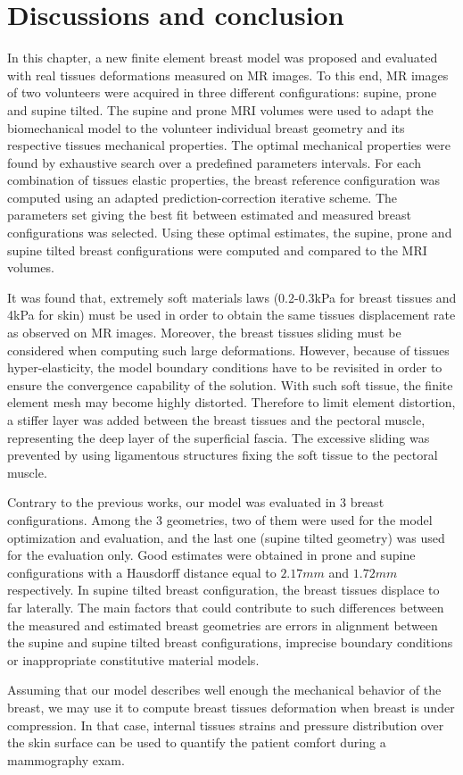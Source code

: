 \section{Discussions and conclusion} \label{section:validation:discutionconclusion}

In this chapter, a new finite element breast model was proposed and  evaluated with real tissues deformations measured on MR images. To this end, MR images of two volunteers were acquired in three different configurations: supine, prone and supine tilted. The supine and prone MRI volumes were used to adapt the biomechanical model to the volunteer individual breast geometry and its respective tissues mechanical properties.  The optimal mechanical properties were found by exhaustive search over a predefined parameters intervals. For each combination of tissues elastic properties,  the breast reference configuration was computed using an adapted prediction-correction iterative scheme. The parameters set giving the best fit between estimated and measured breast configurations was selected.  Using these optimal estimates, the supine, prone and supine tilted breast configurations were computed and compared to the MRI volumes.

It was found that, extremely soft materials laws (0.2-0.3kPa for breast tissues and 4kPa for skin) must be used in order to obtain the same tissues displacement rate as observed on MR images. Moreover, the breast tissues sliding must be considered when computing such large deformations. However, because of tissues hyper-elasticity, the model boundary conditions have to be revisited in order to ensure the convergence capability of the solution. With such soft tissue, the finite element mesh may become highly distorted. Therefore to limit element distortion, a stiffer layer was added between the breast tissues and the pectoral muscle, representing the deep layer of the superficial fascia. The excessive  sliding was prevented by using ligamentous structures fixing the soft tissue to the pectoral muscle.

Contrary to the previous works, our model was evaluated in 3 breast configurations. Among the 3 geometries, two of them were used for the model optimization and evaluation, and the last one (supine tilted geometry) was used for the evaluation only. Good estimates were obtained in prone and supine configurations with a Hausdorff distance equal to $2.17 mm$ and $1.72 mm$ respectively.  In supine tilted breast configuration, the breast tissues displace to far laterally.  The main factors that could contribute to such differences between the measured and estimated breast geometries are errors in alignment between the supine and supine tilted breast configurations, imprecise boundary conditions or inappropriate constitutive material models. 

Assuming that our model describes well enough the mechanical behavior of the breast, we may use it to compute breast tissues deformation when breast is under compression. In that case, internal tissues strains and pressure distribution over the skin surface can be used to quantify the patient comfort during a mammography exam. 
   